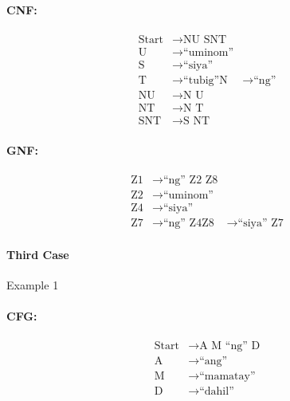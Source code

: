 \paragraph{CNF:}
\begin{equation*}
    \begin{aligned}
        \text{Start}   & \rightarrow \text{NU SNT}   \\
        \text{U} & \rightarrow \text{“uminom”} \\
        \text{S} & \rightarrow \text{“siya”} \\
        \text{T} & \rightarrow \text{“tubig”}
        \text{N} & \rightarrow \text{“ng”} \\
        \text{NU} & \rightarrow \text{N U} \\
        \text{NT} & \rightarrow \text{N T} \\
        \text{SNT} & \rightarrow \text{S NT}
    \end{aligned}
\end{equation*}

\paragraph{GNF:}
\begin{equation*}
    \begin{aligned}
        \text{Z1}   & \rightarrow \text{“ng” Z2 Z8}   \\
        \text{Z2} & \rightarrow \text{“uminom”} \\
        \text{Z4} & \rightarrow \text{“siya”} \\
        \text{Z7} & \rightarrow \text{“ng” Z4}
        \text{Z8} & \rightarrow \text{“siya” Z7}
    \end{aligned}
\end{equation*}


\paragraph{Third Case}
Example 1
\paragraph{CFG:}
\begin{equation*}
    \begin{aligned}
        \text{Start}   & \rightarrow \text{A M “ng” D}   \\
        \text{A} & \rightarrow \text{“ang”} \\
        \text{M} & \rightarrow \text{“mamatay”} \\
        \text{D} & \rightarrow \text{“dahil”}
    \end{aligned}
\end{equation*}

